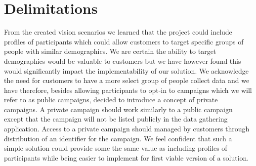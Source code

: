 \section{Delimitations}
\label{sec:delimitations}
From the created vision scenarios we learned that the project could include profiles of participants which could allow customers to target specific groups of people with similar demographics. We are certain the ability to target demographics would be valuable to customers but we have however found this would significantly impact the implementability of our solution. We acknowledge the need for customers to have a more select group of people collect data and we have therefore, besides allowing participants to opt-in to campaigns which we will refer to as public campaigns, decided to introduce a concept of private campaigns. A private campaign should work similarly to a public campaign except that the campaign will not be listed publicly in the data gathering application. Access to a private campaign should managed by customers through distribution of an identifier for the campaign. We feel confident that such a simple solution could provide some the same value as including profiles of participants while being easier to implement for first viable version of a solution.

